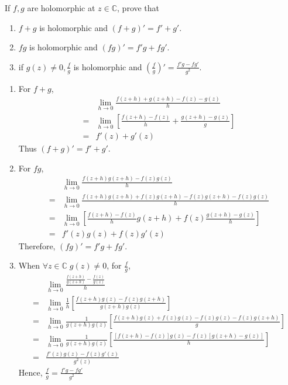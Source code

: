 \documentclass[11pt, oneside]{book}
\begin{document}
\begin{ex}\label{ex:holomorphic_functions_properties}
	If $f, g$ are holomorphic at $z \in \mathbb{C}$, prove that
	\begin{enumerate}
		\item $f + g$ is holomorphic and $(f + g)' = f' + g'$. \label{item:holomorphic_linearity}
		\item $fg$ is holomorphic and $(fg)' = f'g + fg'$. \label{item:holomorphic_product_rule}
		\item if $g(z) \neq 0, \frac{f}{g}$ is holomorphic and $(\frac{f}{g})' = \frac{f'g - fg'}{g^2}$. \label{item:holomorphic_quotient_rule}
	\end{enumerate}

	\begin{solution}
		\begin{enumerate}
			\item For $f + g$,
			\begin{align*}
					&\lim_{h \to 0} \frac{f(z + h) + g(z + h) - f(z) - g(z)}{h} \\
				= &\lim_{h \to 0} \left[ \frac{f(z + h) - f(z)}{h} + \frac{g(z + h) - g(z)}{g} \right] \\
				= & f'(z) + g'(z) 
			\end{align*}
			Thus $(f + g)' = f' + g'$.

			\item For $fg$,
			\begin{align*}
					&\lim_{h \to 0} \frac{f(z + h)g(z + h) - f(z)g(z)}{h} \\
				= &\lim_{h \to 0} \frac{f(z + h)g(z + h) + f(z)g(z + h) - f(z)g(z + h) - f(z)g(z)}{h} \\
				= &\lim_{h \to 0} \left[ \frac{f(z + h) - f(z)}{h} g(z + h) + f(z) \frac{g(z + h) - g(z)}{h} \right] \\
				= &f'(z)g(z) + f(z)g'(z)
			\end{align*}
			Therefore, $(fg)' = f'g + fg'$.

			\item When $\forall z \in \mathbb{C} \; g(z) \neq 0$, for $\frac{f}{g}$,
			\begin{align*}
					&\lim_{h \to 0} \frac{\frac{f(z + h)}{g(z + h)} - \frac{f(z)}{g(z)}}{h} \\
				= &\lim_{h \to 0} \frac{1}{h} \left[ \frac{f(z + h)g(z) - f(z)g(z + h)}{g(z + h)g(z)} \right] \\
				= &\lim_{h \to 0} \frac{1}{g(z + h)g(z)} \left[ \frac{f(z + h)g(z) + f(z)g(z) - f(z)g(z) - f(z)g(z + h)}{g} \right] \\
				= &\lim_{h \to 0} \frac{1}{g(z + h)g(z)} \left[ \frac{[f(z + h) - f(z)]g(z) - f(z)[g(z + h) - g(z)]}{h} \right] \\
				= &\frac{f'(z)g(z) - f(z)g'(z)}{g^2(z)}  
			\end{align*}
			Hence, $\frac{f}{g} = \frac{f'g - fg'}{g^2} $
		\end{enumerate}
	\end{solution}
\end{ex}
\end{document}
